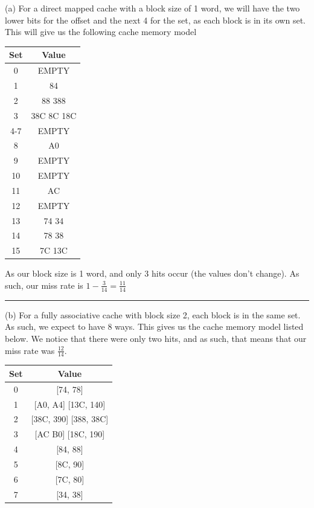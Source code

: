 \documentclass[12pt, letter]{article}
\begin{document}
	(a) For a direct mapped cache with a block size of 1 word, we will have the two lower bits for the offset and the next 4 for the set, as each block is in its own set. This will give us the following cache memory model
	\newpage
	\begin{table}
		\begin{center}
			\begin{tabular}{c | c}
				Set & Value\\
				\hline\hline
				0 & EMPTY\\
				1 & 84 \\
				2 & 88 388\\
				3 & 38C 8C 18C\\
				4-7 & EMPTY\\
				8 & A0\\
				9 & EMPTY\\
				10 & EMPTY\\
				11 & AC\\
				12 & EMPTY\\
				13 & 74 34\\
				14 & 78 38\\
				15 & 7C 13C\\ 
				\hline
			\end{tabular}
		\end{center}
	\end{table} 
	
	
	As our block size is 1 word, and only 3 hits occur (the values don't change). As such, our miss rate is $1 - \frac{3}{14} = \frac{11}{14}$
	\bigskip
	\hrule
	
	(b) For a fully associative cache with block size 2, each block is in the same set. As such, we expect to have 8 ways. This gives us the cache memory model listed below. We notice that there were only two hits, and as such, that means that our miss rate was $\frac{12}{14}$.
	
	\begin{table}[h]
		\begin{center}
			\begin{tabular}{c | c}
				Set & Value\\
				\hline\hline
				0 & [74, 78]\\
				\hline
				1 & [A0, A4] [13C, 140]\\
				\hline
				2 & [38C, 390] [388, 38C]\\
				\hline
				3 & [AC B0] [18C, 190]\\
				\hline
				4 & [84, 88]\\
				\hline
				5 & [8C, 90]\\
				\hline
				6 & [7C, 80]\\
				\hline
				7 & [34, 38]\\
				\hline
			\end{tabular}
		\end{center}
	\end{table} 
\end{document}
